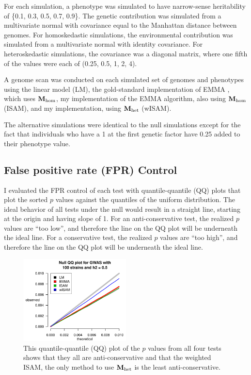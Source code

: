 For each simulation, a phenotype was simulated to have narrow-sense heritability of \{0.1, 0.3, 0.5, 0.7, 0.9\}.
The genetic contribution was simulated from a multivariate normal with covariance equal to the Manhattan distance between genomes.
For homoskedastic simulations, the environmental contribution was simulated from a multivariate normal with identity covariance.
For heteroskedastic simulations, the covariance was a diagonal matrix, where one fifth of the values were each of (0.25, 0.5, 1, 2, 4).

A genome scan was conducted on each simulated set of genomes and phenotypes using the linear model (LM), the gold-standard implementation of EMMA \citep{Kang2008}, which uses $\mathbf{M}_\text{hom}$, my implementation of the EMMA algorithm, also using $\mathbf{M}_\text{hom}$ (ISAM), and my implementation, using $\mathbf{M}_\text{het}$ (wISAM).

The alternative simulations were identical to the null simulations except for the fact that individuals who have a 1 at the first genetic factor have 0.25 added to their phenotype value.

\subsection{False positive rate (FPR) Control}

I evaluated the FPR control of each test with quantile-quantile (QQ) plots that plot the sorted $p$ values against the quantiles of the uniform distribution.
The ideal behavior of all tests under the null would result in a straight line, starting at the origin and having slope of 1.
For an anti-conservative test, the realized $p$ values are ``too low'', and therefore the line on the QQ plot will be underneath the ideal line.
For a conservative test, the realized $p$ values are ``too high'', and therefore the line on the QQ plot will be underneath the ideal line.

\begin{figure}%
  \centering
  \includegraphics[width = 0.5\textwidth]{images/exampleQQ.pdf}
  \caption[
    Example quantile-quantile (QQ) plot.
  ]
  {
    This quantile-quantile (QQ) plot of the $p$ values from all four tests shows that they all are anti-conservative and that the weighted ISAM, the only method to use $\mathbf{M}_\text{het}$ is the least anti-conservative.
  }
  \label{fig:exampleQQ}
\end{figure}

